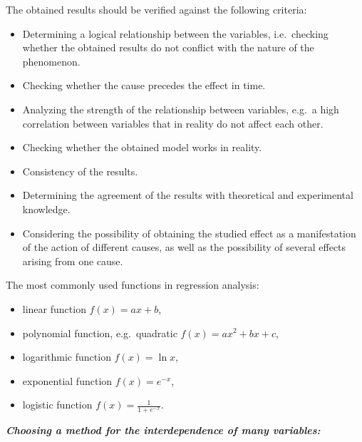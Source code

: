 \documentclass[
  english,
  letterpaper,
  DIV=11,
  numbers=noendperiod]{scrreprt}
\providecommand{\tightlist}{%
  \setlength{\itemsep}{0pt}\setlength{\parskip}{0pt}}
\begin{document}
The obtained results should be verified against the following criteria:

\begin{itemize}
\tightlist
\item
  Determining a logical relationship between the variables,
  i.e.~checking whether the obtained results do not conflict with the
  nature of the phenomenon.
\item
  Checking whether the cause precedes the effect in time.
\item
  Analyzing the strength of the relationship between variables, e.g.~a
  high correlation between variables that in reality do not affect each
  other.
\item
  Checking whether the obtained model works in reality.
\item
  Consistency of the results.
\item
  Determining the agreement of the results with theoretical and
  experimental knowledge.
\item
  Considering the possibility of obtaining the studied effect as a
  manifestation of the action of different causes, as well as the
  possibility of several effects arising from one cause.
\end{itemize}

The most commonly used functions in regression analysis:

\begin{itemize}
\tightlist
\item
  linear function \(f(x)=ax+b\),
\item
  polynomial function, e.g.~quadratic \(f(x)=ax^2+bx+c\),
\item
  logarithmic function \(f(x) = \ln x\),
\item
  exponential function \(f(x)=e^{-x}\),
\item
  logistic function \(f(x) = \frac{1}{1+e^{-x}}\).
\end{itemize}

\textbf{\emph{Choosing a method for the interdependence of many
variables:}}
\end{document}
